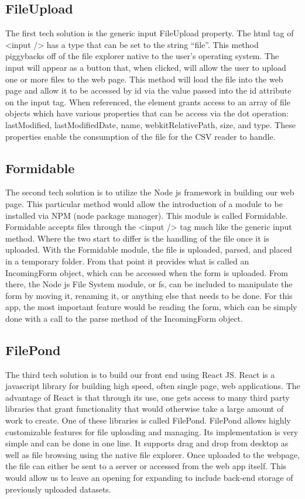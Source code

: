 \documentclass[letterpaper,10pt,titlepage, onecolumn]{IEEEtran}
\begin{document}
\subsection{FileUpload}
The first tech solution is the generic input FileUpload property. The html tag of <input /> has a type that can be set to the string “file”. This method piggybacks off of the file explorer native to the user’s operating system. The input will appear as a button that, when clicked, will allow the user to upload one or more files to the web page. This method will load the file into the web page and allow it to be accessed by id via the value passed into the id attribute on the input tag. When referenced, the element grants access to an array of file objects which have various properties that can be access via the dot operation: lastModified, lastModifiedDate, name, webkitRelativePath, size, and type. These properties enable the consumption of the file for the CSV reader to handle.

\subsection{Formidable}
The second tech solution is to utilize the Node js framework in building our web page. This particular method would allow the introduction of a module to be installed via NPM (node package manager). This module is called Formidable. Formidable accepts files through the <input /> tag much like the generic input method. Where the two start to differ is the handling of the file once it is uploaded. With the Formidable module, the file is uploaded, parsed, and placed in a temporary folder. From that point it provides what is called an IncomingForm object, which can be accessed when the form is uploaded. From there, the Node js File System module, or fs, can be included to manipulate the form by moving it, renaming it, or anything else that needs to be done. For this app, the most important feature would be reading the form, which can be simply done with a call to the parse method of the IncomingForm object.

\subsection{FilePond}
The third tech solution is to build our front end using React JS. React is a javascript library for building high speed, often single page, web applications. The advantage of React is that through its use, one gets access to many third party libraries that grant functionality that would otherwise take a large amount of work to create. One of these libraries is called FilePond. FilePond allows highly customizable features for file uploading and managing. Its implementation is very simple and can be done in one line. It supports drag and drop from desktop as well as file browsing using the native file explorer. Once uploaded to the webpage, the file can either be sent to a server or accessed from the web app itself. This would allow us to leave an opening for expanding to include back-end storage of previously uploaded datasets.
\end{document}
